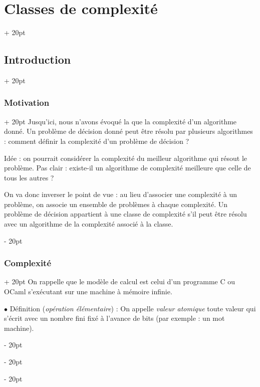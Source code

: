 \documentclass[a4paper, 12pt, twoside]{article}
\newcommand{\ind}[1][20pt]{\advance\leftskip + #1}
\newcommand{\deind}[1][20pt]{\advance\leftskip - #1}
\newenvironment{indt}[2][20pt]{#2 \par \ind[#1]}{\par \deind} %
\begin{document}
    \begin{indt}{\section{Classes de complexité}}
        \begin{indt}{\subsection{Introduction}}
            \begin{indt}{\subsubsection{Motivation}}
                Jusqu'ici, nous n'avons évoqué la que la complexité d'un algorithme donné.
                Un problème de décision donné peut être résolu par plusieurs algorithmes : comment définir la complexité d'un problème de décision ?

                Idée : on pourrait considérer la complexité du meilleur algorithme qui résout le problème.
                Pas clair : existe-il un algorithme de complexité meilleure que celle de tous les autres ?

                On va donc inverser le point de vue : au lieu d'associer une complexité à un problème, on associe un ensemble de problèmes à chaque complexité.
                Un problème de décision appartient à une classe de complexité s'il peut être résolu avec un algorithme de la complexité associé à la classe.
            \end{indt}

            \vspace{12pt}
            
            \begin{indt}{\subsubsection{Complexité}}
                On rappelle que le modèle de calcul est celui d'un programme C ou OCaml s'exécutant sur une machine à mémoire infinie.

                \vspace{12pt}
                
                $\bullet$ Définition (\textit{opération élémentaire}) :
                On appelle \emph{valeur atomique} toute valeur qui s'écrit avec un nombre fini fixé à l'avance de bits (par exemple : un mot machine).


\end{indt}
\end{indt}
\end{indt}
\end{document}
